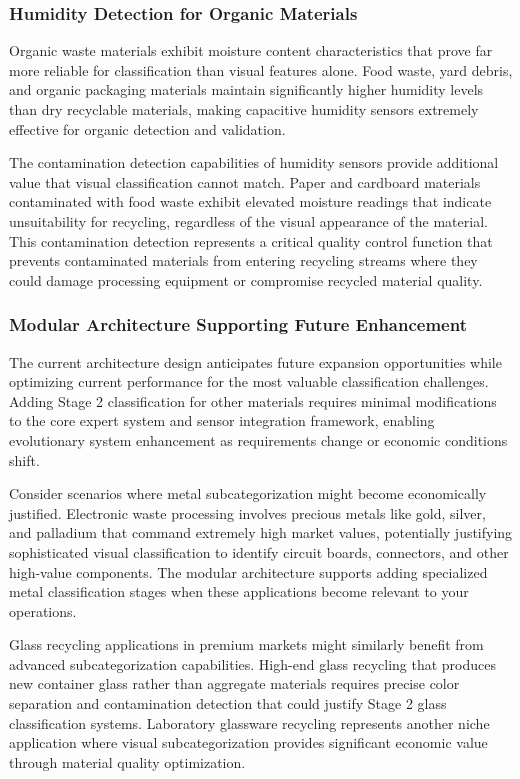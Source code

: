 \documentclass[11pt, a4paper]{article}
\begin{document}
\subsubsection{Humidity Detection for Organic Materials}

Organic waste materials exhibit moisture content characteristics that prove far more reliable for classification than visual features alone. Food waste, yard debris, and organic packaging materials maintain significantly higher humidity levels than dry recyclable materials, making capacitive humidity sensors extremely effective for organic detection and validation.

The contamination detection capabilities of humidity sensors provide additional value that visual classification cannot match. Paper and cardboard materials contaminated with food waste exhibit elevated moisture readings that indicate unsuitability for recycling, regardless of the visual appearance of the material. This contamination detection represents a critical quality control function that prevents contaminated materials from entering recycling streams where they could damage processing equipment or compromise recycled material quality.

\subsubsection{Modular Architecture Supporting Future Enhancement}

The current architecture design anticipates future expansion opportunities while optimizing current performance for the most valuable classification challenges. Adding Stage 2 classification for other materials requires minimal modifications to the core expert system and sensor integration framework, enabling evolutionary system enhancement as requirements change or economic conditions shift.

Consider scenarios where metal subcategorization might become economically justified. Electronic waste processing involves precious metals like gold, silver, and palladium that command extremely high market values, potentially justifying sophisticated visual classification to identify circuit boards, connectors, and other high-value components. The modular architecture supports adding specialized metal classification stages when these applications become relevant to your operations.

Glass recycling applications in premium markets might similarly benefit from advanced subcategorization capabilities. High-end glass recycling that produces new container glass rather than aggregate materials requires precise color separation and contamination detection that could justify Stage 2 glass classification systems. Laboratory glassware recycling represents another niche application where visual subcategorization provides significant economic value through material quality optimization.
\end{document}
